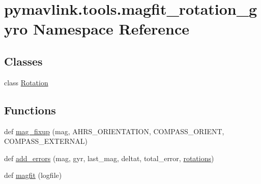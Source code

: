 \hypertarget{namespacepymavlink_1_1tools_1_1magfit__rotation__gyro}{}\section{pymavlink.\+tools.\+magfit\+\_\+rotation\+\_\+gyro Namespace Reference}
\label{namespacepymavlink_1_1tools_1_1magfit__rotation__gyro}
\subsection*{Classes}
\begin{DoxyCompactItemize}
\item 
class \mbox{\hyperlink{classpymavlink_1_1tools_1_1magfit__rotation__gyro_1_1Rotation}{Rotation}}
\end{DoxyCompactItemize}
\subsection*{Functions}
\begin{DoxyCompactItemize}
\item 
def \mbox{\hyperlink{namespacepymavlink_1_1tools_1_1magfit__rotation__gyro_af1e9e314abb16f339b04627f6de1d866}{mag\+\_\+fixup}} (mag, A\+H\+R\+S\+\_\+\+O\+R\+I\+E\+N\+T\+A\+T\+I\+ON, C\+O\+M\+P\+A\+S\+S\+\_\+\+O\+R\+I\+E\+NT, C\+O\+M\+P\+A\+S\+S\+\_\+\+E\+X\+T\+E\+R\+N\+AL)
\item 
def \mbox{\hyperlink{namespacepymavlink_1_1tools_1_1magfit__rotation__gyro_ace75078283945a476e29455cef312625}{add\+\_\+errors}} (mag, gyr, last\+\_\+mag, deltat, total\+\_\+error, \mbox{\hyperlink{namespacepymavlink_1_1tools_1_1magfit__rotation__gyro_a5c1736b19d46521b3acc4397d60cd1d7}{rotations}})
\item 
def \mbox{\hyperlink{namespacepymavlink_1_1tools_1_1magfit__rotation__gyro_ae8efb99d4a985344c87bdda430c85b7c}{magfit}} (logfile)
\end{DoxyCompactItemize}
